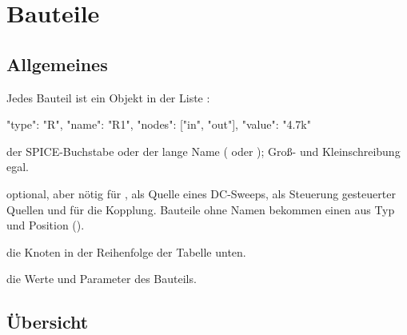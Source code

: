 \chapter{Bauteile}
\label{kap:format-bauteile}

\section{Allgemeines}

Jedes Bauteil ist ein Objekt in der Liste :

\begin{json}
{ "type": "R", "name": "R1", "nodes": ["in", "out"], "value": "4.7k" }
\end{json}

\begin{description}[style=nextline,leftmargin=2em]
  \item[\code{type}] der SPICE-Buchstabe oder der lange Name ( oder
    ); Groß- und Kleinschreibung egal.
  \item[\code{name}] optional, aber nötig für , als Quelle eines
    DC-Sweeps, als Steuerung gesteuerter Quellen und für die Kopplung.
    Bauteile ohne Namen bekommen einen aus Typ und Position ().
  \item[\code{nodes}] die Knoten in der Reihenfolge der Tabelle unten.
  \item[weitere Schlüssel] die Werte und Parameter des Bauteils.
\end{description}

\section{Übersicht}


